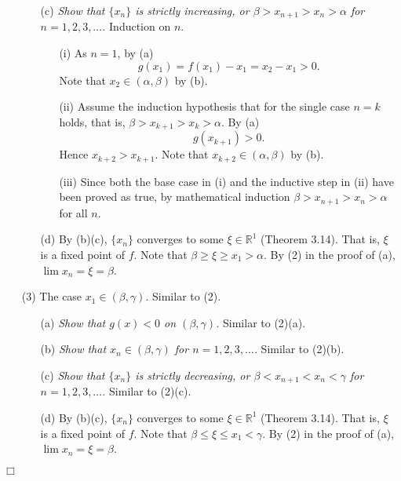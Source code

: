 \documentclass{article}
\begin{document}
\begin{enumerate}
\begin{enumerate}
  \item[(c)]
  \emph{Show that $\{x_n\}$ is strictly increasing,
  or $\beta > x_{n+1} > x_n > \alpha$ for $n = 1, 2, 3, \ldots$.}
  Induction on $n$.
    \begin{enumerate}
    \item[(i)]
    As $n = 1$, by (a)
    \[
      g(x_1) = f(x_1) - x_1 = x_2 - x_1 > 0.
    \]
    Note that $x_2 \in (\alpha, \beta)$ by (b).

    \item[(ii)]
    Assume the induction hypothesis that for the single case $n = k$ holds,
    that is, $\beta > x_{k+1} > x_k > \alpha$.
    By (a)
    \[
      g(x_{k+1}) > 0.
    \]
    Hence $x_{k+2} > x_{k+1}$.
    Note that $x_{k+2} \in (\alpha, \beta)$ by (b).

    \item[(iii)]
    Since both the base case in (i) and
    the inductive step in (ii) have been proved as true,
    by mathematical induction $\beta > x_{n+1} > x_n > \alpha$ for all $n$.
    \end{enumerate}

  \item[(d)]
  By (b)(c),
  $\{x_n\}$ converges to some $\xi \in \mathbb{R}^1$ (Theorem 3.14).
  That is, $\xi$ is a fixed point of $f$.
  Note that $\beta \geq \xi \geq x_1 > \alpha$.
  By (2) in the proof of (a), $\lim x_n = \xi = \beta$.
  \end{enumerate}

\item[(3)]
The case $x_1 \in (\beta,\gamma)$.
Similar to (2).
  \begin{enumerate}
  \item[(a)]
  \emph{Show that $g(x) < 0$ on $(\beta,\gamma)$.}
  Similar to (2)(a).

  \item[(b)]
  \emph{Show that $x_n \in (\beta,\gamma)$ for $n = 1, 2, 3, \ldots$.}
  Similar to (2)(b).

  \item[(c)]
  \emph{Show that $\{x_n\}$ is strictly decreasing,
  or $\beta < x_{n+1} < x_n < \gamma$ for $n = 1, 2, 3, \ldots$.}
  Similar to (2)(c).

  \item[(d)]
  By (b)(c),
  $\{x_n\}$ converges to some $\xi \in \mathbb{R}^1$ (Theorem 3.14).
  That is, $\xi$ is a fixed point of $f$.
  Note that $\beta \leq \xi \leq x_1 < \gamma$.
  By (2) in the proof of (a), $\lim x_n = \xi = \beta$.
  \end{enumerate}
\end{enumerate}
$\Box$ \\
\end{document}
